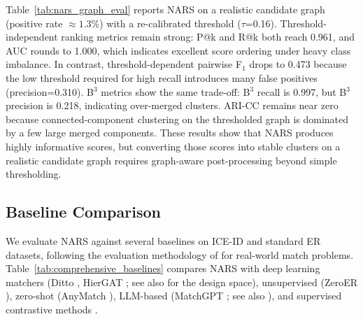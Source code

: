 \documentclass{article}
\begin{document}
Table~\ref{tab:nars_graph_eval} reports NARS on a realistic candidate graph (positive rate $\approx 1.3\%$) with a re-calibrated threshold ($\tau$=0.16). Threshold-independent ranking metrics remain strong: P@k and R@k both reach 0.961, and AUC rounds to 1.000, which indicates excellent score ordering under heavy class imbalance. In contrast, threshold-dependent pairwise F$_1$ drops to 0.473 because the low threshold required for high recall introduces many false positives (precision=0.310). B$^3$ metrics show the same trade-off: B$^3$ recall is 0.997, but B$^3$ precision is 0.218, indicating over-merged clusters. ARI-CC remains near zero because connected-component clustering on the thresholded graph is dominated by a few large merged components. These results show that NARS produces highly informative scores, but converting those scores into stable clusters on a realistic candidate graph requires graph-aware post-processing beyond simple thresholding.

\subsection{Baseline Comparison}

We evaluate NARS against several baselines on ICE-ID and standard ER datasets, following the evaluation methodology of \citet{Kopcke2010} for real-world match problems. Table~\ref{tab:comprehensive_baselines} compares NARS with deep learning matchers (Ditto \cite{Li2020DeepEM}, HierGAT \cite{yao2022hiergat}; see also \citealp{mudgal2018deep} for the design space), unsupervised (ZeroER \cite{wu2020zeroer}), zero-shot (AnyMatch \cite{zhang2024anymatch}), LLM-based (MatchGPT \cite{peeters2025entity}; see also \citealp{li2024booster, wadhwa2024learning}), and supervised contrastive methods \cite{Peeters2022}.
\end{document}

